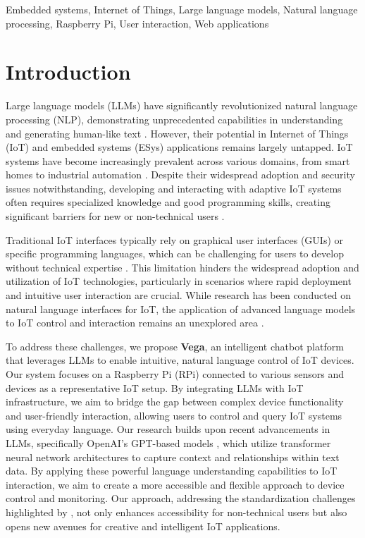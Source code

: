 \documentclass{ieeeaccess}
\begin{document}
\begin{keywords}
    Embedded systems, Internet of Things, Large language models, Natural language processing, Raspberry Pi, User interaction, Web applications
\end{keywords}

\titlepgskip=-21pt

\maketitle

\section{Introduction}\label{sec:introduction}

Large language models (LLMs) have significantly revolutionized natural language processing (NLP), demonstrating unprecedented capabilities in understanding and generating human-like text \cite{Kumar2024}. However, their potential in Internet of Things (IoT) and embedded systems (ESys) applications remains largely untapped. IoT systems have become increasingly prevalent across various domains, from smart homes to industrial automation \cite{8355897}. Despite their widespread adoption and security issues notwithstanding, developing and interacting with adaptive IoT systems often requires specialized knowledge and good programming skills, creating significant barriers for new or non-technical users \cite{10.1145/3447526.3472036}.

Traditional IoT interfaces typically rely on graphical user interfaces (GUIs) or specific programming languages, which can be challenging for users to develop without technical expertise \cite{10.1145/3447526.3472036}. This limitation hinders the widespread adoption and utilization of IoT technologies, particularly in scenarios where rapid deployment and intuitive user interaction are crucial. While research has been conducted on natural language interfaces for IoT, the application of advanced language models to IoT control and interaction remains an unexplored area \cite{KASSAB2020102663}.

To address these challenges, we propose \textbf{Vega}, an intelligent chatbot platform that leverages LLMs to enable intuitive, natural language control of IoT devices. Our system focuses on a Raspberry Pi (RPi) connected to various sensors and devices as a representative IoT setup. By integrating LLMs with IoT infrastructure, we aim to bridge the gap between complex device functionality and user-friendly interaction, allowing users to control and query IoT systems using everyday language. Our research builds upon recent advancements in LLMs, specifically OpenAI's GPT-based models \cite{OpenAI_GPT}, which utilize transformer neural network architectures to capture context and relationships within text data. By applying these powerful language understanding capabilities to IoT interaction, we aim to create a more accessible and flexible approach to device control and monitoring. Our approach, addressing the standardization challenges highlighted by \citet{7821686}, not only enhances accessibility for non-technical users but also opens new avenues for creative and intelligent IoT applications.
\end{document}
